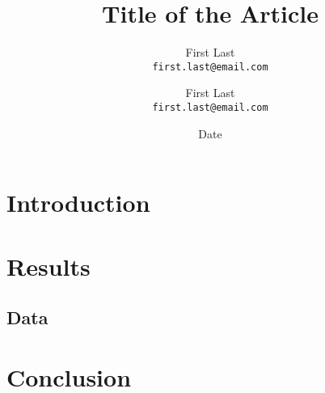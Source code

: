 \documentclass{academic}
\title{Title of the Article}
\author{
  First Last \\
  \texttt{first.last@email.com}
  \and
  First Last \\
  \texttt{first.last@email.com}
}
\date{Date}
\begin{document}
  \maketitle

\begin{abstract}
  \blindtext
\end{abstract}

\section{Introduction}
\blindtext

\section{Results}
\blindtext
\subsection{Data}
\blindtext

\section{Conclusion}
\blindtext
\end{document}
